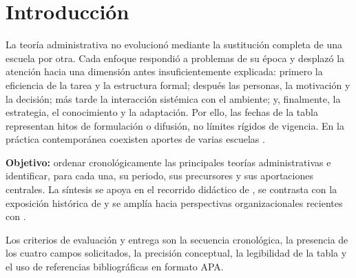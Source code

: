 \documentclass[11pt,letterpaper,oneside]{article}
\begin{document}
\section{Introducción}

La teoría administrativa no evolucionó mediante la sustitución completa de una escuela por otra. Cada enfoque respondió a problemas de su época y desplazó la atención hacia una dimensión antes insuficientemente explicada: primero la eficiencia de la tarea y la estructura formal; después las personas, la motivación y la decisión; más tarde la interacción sistémica con el ambiente; y, finalmente, la estrategia, el conocimiento y la adaptación. Por ello, las fechas de la tabla representan hitos de formulación o difusión, no límites rígidos de vigencia. En la práctica contemporánea coexisten aportes de varias escuelas \citep{larrarteSinFecha,bright2019,sanchezBanuelos2017}.

\textbf{Objetivo:} ordenar cronológicamente las principales teorías administrativas e identificar, para cada una, su periodo, sus precursores y sus aportaciones centrales. La síntesis se apoya en el recorrido didáctico de \citet{larrarteSinFecha}, se contrasta con la exposición histórica de \citet{bright2019} y se amplía hacia perspectivas organizacionales recientes con \citet{sanchezBanuelos2017}.

Los criterios de evaluación y entrega son la secuencia cronológica, la presencia de los cuatro campos solicitados, la precisión conceptual, la legibilidad de la tabla y el uso de referencias bibliográficas en formato APA.
\end{document}
